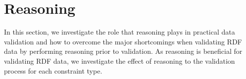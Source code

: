 \documentclass{acm_proc_article-sp}
\begin{document}

\section{Reasoning}
\label{reasoning}

In this section, we investigate the role that reasoning plays in practical data validation and 
how to overcome the major shortcomings when validating RDF data by performing reasoning prior to validation.
As reasoning is beneficial for validating RDF data, we investigate the effect of reasoning to the validation process for each constraint type.

\end{document}
